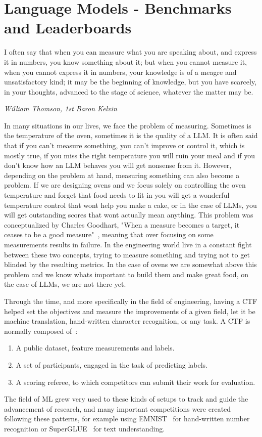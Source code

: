 \section{Language Models - Benchmarks and Leaderboards}\label{sec:b}


\epigraph{I often say that when you can measure what you are speaking about, and express it in numbers, you know something about it; but when you cannot measure it, when you cannot express it in numbers, your knowledge is of a meagre and unsatisfactory kind; it may be the beginning of knowledge, but you have scarcely, in your thoughts, advanced to the stage of science, whatever the matter may be.}{\textit{William Thomson, 1st Baron Kelvin}}

In many situations in our lives, we face the problem of measuring. Sometimes is the temperature of the oven, sometimes it is the quality of a \gls{LLM}. It is often said that if you can't measure something, you can't improve or control it, which is mostly true, if you miss the right temperature you will ruin your meal and if you don't know how an \gls{LLM} behaves you will get nonsense from it. 
However, depending on the problem at hand, measuring something can also become a problem. If we are designing ovens and we focus solely on controlling the oven temperature and forget that food needs to fit in you will get a wonderful temperature control that wont help you make a cake, or in the case of \glspl{LLM}, you will get outstanding scores that wont actually mean anything. This problem was conceptualized by Charles Goodhart, "When a measure becomes a target, it ceases to be a good measure"~\cite{strathern1997improving}, meaning that over focusing on some measurements results in failure.
In the engineering world live in a constant fight between these two concepts, trying to measure something and trying not to get blinded by the resulting metrics. In the case of ovens we are somewhat above this problem and we know whats important to build them and make great food, on the case of \glspl{LLM}, we are not there yet.


Through the time, and more specifically in the field of engineering, having a \gls{CTF} helped set the objectives and measure the improvements of a given field, let it be machine translation, hand-written character recognition, or any task. A \gls{CTF} is normally composed of~\cite{donoho201750}:
\begin{enumerate}
    \item A public dataset, feature measurements and labels.
    \item A set of participants, engaged in the task of predicting labels.
    \item A scoring referee, to which competitors can submit their work for evaluation.
\end{enumerate}
The field of \gls{ML} grew very used to these kinds of setups to track and guide the advancement of research, and many important competitions were created following these patterns, for example using EMNIST~\cite{cohen2017emnist} for hand-written number recognition or SuperGLUE~\cite{wang2019superglue} for text understanding.

